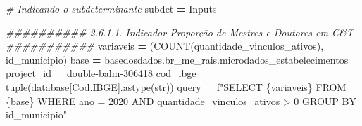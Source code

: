 \documentclass[
  12,
  dvipsnames]{article}
\newenvironment{Shaded}{\begin{snugshade}}{\end{snugshade}}
\newcommand{\BuiltInTok}[1]{#1}
\newcommand{\CommentTok}[1]{\textcolor[rgb]{0.56,0.35,0.01}{\textit{#1}}}
\newcommand{\NormalTok}[1]{#1}
\newcommand{\OperatorTok}[1]{\textcolor[rgb]{0.81,0.36,0.00}{\textbf{#1}}}
\newcommand{\SpecialCharTok}[1]{\textcolor[rgb]{0.00,0.00,0.00}{#1}}
\newcommand{\SpecialStringTok}[1]{\textcolor[rgb]{0.31,0.60,0.02}{#1}}
\newcommand{\StringTok}[1]{\textcolor[rgb]{0.31,0.60,0.02}{#1}}
\begin{document}
\begin{Shaded}
\begin{Highlighting}[]
\CommentTok{\# Indicando o subdeterminante}
\NormalTok{subdet }\OperatorTok{=} \StringTok{\textquotesingle{}Inputs\textquotesingle{}}

\CommentTok{\#\#\#\#\#\#\#\#\#\# 2.6.1.1. Indicador Proporção de Mestres e Doutores em C\&T \#\#\#\#\#\#\#\#\#\#\#}
\NormalTok{variaveis }\OperatorTok{=}\NormalTok{ (}\StringTok{\textquotesingle{}COUNT(quantidade\_vinculos\_ativos), id\_municipio\textquotesingle{}}\NormalTok{)}
\NormalTok{base }\OperatorTok{=} \StringTok{\textquotesingle{}\textasciigrave{}basedosdados.br\_me\_rais.microdados\_estabelecimentos\textasciigrave{}\textquotesingle{}}
\NormalTok{project\_id }\OperatorTok{=} \StringTok{\textquotesingle{}double{-}balm{-}306418\textquotesingle{}}
\NormalTok{cod\_ibge }\OperatorTok{=} \BuiltInTok{tuple}\NormalTok{(database[}\StringTok{\textquotesingle{}Cod.IBGE\textquotesingle{}}\NormalTok{].astype(}\BuiltInTok{str}\NormalTok{))}
\NormalTok{query }\OperatorTok{=} \SpecialStringTok{f"SELECT }\SpecialCharTok{\{}\NormalTok{variaveis}\SpecialCharTok{\}}\SpecialStringTok{ FROM }\SpecialCharTok{\{}\NormalTok{base}\SpecialCharTok{\}}\SpecialStringTok{ WHERE ano = 2020 AND quantidade\_vinculos\_ativos \textgreater{} 0 GROUP BY id\_municipio"}


\end{Highlighting}
\end{Shaded}
\end{document}
